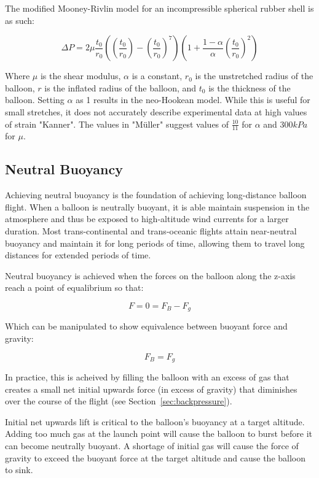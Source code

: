 \documentclass[usaAMS,usenatbib]{mn2e}
\newcommand{\f}[2]{\frac{#1}{#2}}
\begin{document}
The modified Mooney-Rivlin model for an incompressible spherical rubber shell is as such:

\begin{equation}
\Delta P = 2\mu\frac{t_0}{r_0}((\frac{t_0}{r_0})-(\frac{t_0}{r_0})^7)(1+\frac{1-\alpha}{\alpha}(\frac{t_0}{r_0})^2)
\end{equation}

Where $\mu$ is the shear modulus, $\alpha$ is a constant, $r_0$ is the unstretched radius of the balloon, $r$ is the inflated radius of the balloon, and $t_0$ is the thickness of the balloon. Setting $\alpha$ as 1 results in the neo-Hookean model. While this is useful for small stretches, it does not accurately describe experimental data at high values of strain "Kanner". The values in "Müller" suggest values of $\f{10}{11}$ for $\alpha$ and $300 kPa$ for $\mu$.

\subsection{Neutral Buoyancy}

Achieving neutral buoyancy is the foundation of achieving long-distance balloon flight. When a balloon is neutrally buoyant, it is able maintain suspension in the atmosphere and thus be exposed to high-altitude wind currents for a larger duration. Most trans-continental and trans-oceanic flights attain near-neutral buoyancy and maintain it for long periods of time, allowing them to travel long distances for extended periods of time.

Neutral buoyancy is achieved when the forces on the balloon along the z-axis reach a point of equalibrium so that:

\begin{equation}
	F = 0 = F_B - F_g
\end{equation}

Which can be manipulated to show equivalence between buoyant force and gravity:

\begin{equation}
	F_B = F_g
\end{equation}

In practice, this is acheived by filling the balloon with an excess of gas that creates a small net initial upwards force (in excess of gravity) that diminishes over the course of the flight (see Section~\ref{sec:backpressure}).

Initial net upwards lift is critical to the balloon's buoyancy at a target altitude. Adding too much gas at the launch point will cause the balloon to burst before it can become neutrally buoyant. A shortage of initial gas will cause the force of gravity to exceed the buoyant force at the target altitude and cause the balloon to sink.
\end{document}
